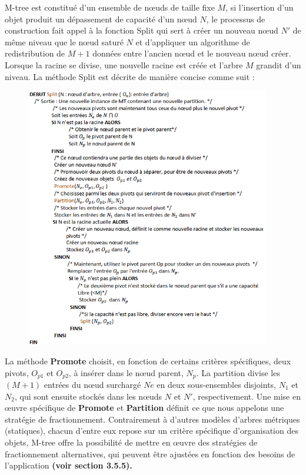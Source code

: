 M-tree est constitué d’un ensemble de nœuds de taille fixe $ M $, si l'insertion d'un objet produit un dépassement de capacité d'un nœud $ N $, le processus de construction fait appel à la fonction Split qui sert à créer un nouveau nœud $ N' $ de même niveau que le nœud saturé $ N  $ et d’appliquer un algorithme de redistribution de $ M+1 $ données entre l’ancien nœud et le nouveau nœud créer. Lorsque la racine se divise, une nouvelle racine est créée et l'arbre $ M $ grandit d'un niveau. La méthode Split est décrite de manière concise comme suit :\\

\begin{figure}[H]
	\centering
	\includegraphics[width=0.95\textwidth]{Figures/split.png} %
\end{figure}

La méthode \textbf{Promote} choisit, en fonction de certains critères spécifiques, deux pivots, $ O_{p1} $ et $  O_{p2} $, à insérer dans le nœud parent, $ N_p $. La partition divise les $ (M + 1) $ entrées du nœud surchargé $ Ne $ en deux sous-ensembles disjoints, $ N_1 $ et $ N_2 $, qui sont ensuite stockés dans les nœuds $ N $ et $ N' $, respectivement. Une mise en œuvre spécifique de \textbf{Promote} et \textbf{Partition} définit ce que nous appelons une stratégie de fractionnement. Contrairement à d'autres modèles d'arbres métriques (statiques), chacun d'entre eux repose sur un critère spécifique d'organisation des objets, M-tree offre la possibilité de mettre en œuvre des stratégies de fractionnement alternatives, qui peuvent être ajustées en fonction des besoins de l'application \textbf{(voir section 3.5.5).}\\

